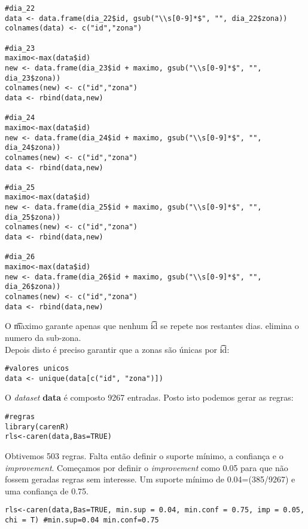 \documentclass[a4paper]{article}
\begin{document}
\begin{lstlisting}
#dia_22
data <- data.frame(dia_22$id, gsub("\\s[0-9]*$", "", dia_22$zona))
colnames(data) <- c("id","zona")

#dia_23
maximo<-max(data$id)
new <- data.frame(dia_23$id + maximo, gsub("\\s[0-9]*$", "", dia_23$zona))
colnames(new) <- c("id","zona")
data <- rbind(data,new)

#dia_24
maximo<-max(data$id)
new <- data.frame(dia_24$id + maximo, gsub("\\s[0-9]*$", "", dia_24$zona))
colnames(new) <- c("id","zona")
data <- rbind(data,new)

#dia_25
maximo<-max(data$id)
new <- data.frame(dia_25$id + maximo, gsub("\\s[0-9]*$", "", dia_25$zona))
colnames(new) <- c("id","zona")
data <- rbind(data,new)

#dia_26
maximo<-max(data$id)
new <- data.frame(dia_26$id + maximo, gsub("\\s[0-9]*$", "", dia_26$zona))
colnames(new) <- c("id","zona")
data <- rbind(data,new)
\end{lstlisting}

O {\t maximo} garante apenas que nenhum {\t id} se repete nos restantes dias. 
elimina o numero da sub-zona.
\\
Depois disto é preciso garantir que a zonas são únicas por {\t id}:
\begin{lstlisting}
#valores unicos
data <- unique(data[c("id", "zona")])
\end{lstlisting}
O \textit{dataset} \textbf{data} é composto 9267 entradas. Posto isto podemos gerar as regras:
\begin{lstlisting}
#regras
library(carenR)
rls<-caren(data,Bas=TRUE)
\end{lstlisting}
Obtivemos 503 regras. Falta então definir o suporte mínimo, a confiança e o \textit{improvement}. Começamos por definir o \textit{improvement} como 0.05 para que não fossem geradas regras sem interesse. Um suporte mínimo de 0.04=(385/9267) e uma confiança de 0.75.

\begin{lstlisting}
rls<-caren(data,Bas=TRUE, min.sup = 0.04, min.conf = 0.75, imp = 0.05, chi = T) #min.sup=0.04 min.conf=0.75
\end{lstlisting}
\end{document}
